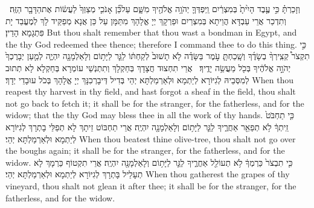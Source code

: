 {וְזָכַרְתָּ֗ כִּ֣י עֶ֤בֶד הָיִ֙יתָ֙ בְּמִצְרַ֔יִם וַֽיִּפְדְּךָ֛ יְהֹוָ֥ה אֱלֹהֶ֖יךָ מִשָּׁ֑ם עַל\maqqaf כֵּ֞ן אָנֹכִ֤י מְצַוְּךָ֙ לַעֲשׂ֔וֹת אֶת\maqqaf הַדָּבָ֖ר הַזֶּֽה׃ \setuma }
{וְתִדְכַר אֲרֵי עַבְדָּא הֲוֵיתָא בְּמִצְרַיִם וּפַרְקָךְ יְיָ אֱלָהָךְ מִתַּמָּן עַל כֵּן אֲנָא מְפַקֵּיד לָךְ לְמֶעֱבַד יָת פִּתְגָמָא הָדֵין׃}
{But thou shalt remember that thou wast a bondman in Egypt, and the \lord\space thy God redeemed thee thence; therefore I command thee to do this thing.}{}
{כִּ֣י תִקְצֹר֩ קְצִֽירְךָ֨ בְשָׂדֶ֜ךָ וְשָֽׁכַחְתָּ֧ עֹ֣מֶר בַּשָּׂדֶ֗ה לֹ֤א תָשׁוּב֙ לְקַחְתּ֔וֹ לַגֵּ֛ר לַיָּת֥וֹם וְלָאַלְמָנָ֖ה יִהְיֶ֑ה לְמַ֤עַן יְבָרֶכְךָ֙ יְהֹוָ֣ה אֱלֹהֶ֔יךָ בְּכֹ֖ל מַעֲשֵׂ֥ה יָדֶֽיךָ׃ \setuma }
{אֲרֵי תִחְצוּד חֲצָדָךְ בְּחַקְלָךְ וְתִתְנְשֵׁי עוֹמְרָא בְּחַקְלָא לָא תְתוּב לְמִסְּבֵיהּ לְגִיּוֹרָא לְיַתְמָא וּלְאַרְמַלְתָּא יְהֵי בְּדִיל דְּיבָרְכִנָּךְ יְיָ אֱלָהָךְ בְּכֹל עוּבָדֵי יְדָךְ׃}
{When thou reapest thy harvest in thy field, and hast forgot a sheaf in the field, thou shalt not go back to fetch it; it shall be for the stranger, for the fatherless, and for the widow; that the \lord\space thy God may bless thee in all the work of thy hands.}{}
{כִּ֤י תַחְבֹּט֙ זֵֽיתְךָ֔ לֹ֥א תְפַאֵ֖ר אַחֲרֶ֑יךָ לַגֵּ֛ר לַיָּת֥וֹם וְלָאַלְמָנָ֖ה יִהְיֶֽה׃}
{אֲרֵי תַחְבּוֹט זֵיתָךְ לָא תְפַלֵּי בָתְרָךְ לְגִיּוֹרָא לְיַתְמָא וּלְאַרְמַלְתָּא יְהֵי׃}
{When thou beatest thine olive-tree, thou shalt not go over the boughs again; it shall be for the stranger, for the fatherless, and for the widow.}{}
{כִּ֤י תִבְצֹר֙ כַּרְמְךָ֔ לֹ֥א תְעוֹלֵ֖ל אַחֲרֶ֑יךָ לַגֵּ֛ר לַיָּת֥וֹם וְלָאַלְמָנָ֖ה יִהְיֶֽה׃}
{אֲרֵי תִקְטוֹף כַּרְמָךְ לָא תְעָלֵיל בָּתְרָךְ לְגִיּוֹרָא לְיַתְמָא וּלְאַרְמַלְתָּא יְהֵי׃}
{When thou gatherest the grapes of thy vineyard, thou shalt not glean it after thee; it shall be for the stranger, for the fatherless, and for the widow.}{}
